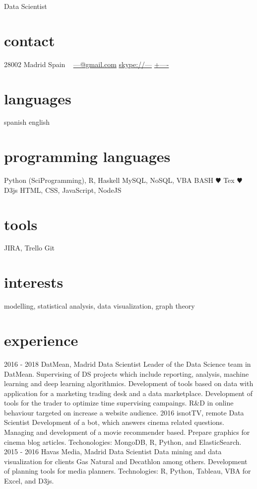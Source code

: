 \documentclass[]{friggeri-cv}
\begin{document}
\ifenglish
{}
       {Data Scientist}


\begin{aside}
  \section{contact}
    28002 Madrid
    Spain
    ~
    \href{mailto:---@gmail.com}{---@gmail.com}
    \href{skype:<--->[add]}{skype://---}
    \href{tel:----}{+----}
  \section{languages}
    spanish
    english
  \section{programming languages}
    Python (SciProgramming), R, Haskell
    MySQL, NoSQL, VBA
    BASH
    {\color{red} $\varheartsuit$} Tex
    {\color{red} $\varheartsuit$} D3js
    HTML, CSS, JavaScript, NodeJS
  \section{tools}
    JIRA, Trello
    Git
\end{aside}

\section{interests}

modelling, statistical analysis, data visualization, graph theory

\section{experience}

\begin{entrylist}
  \entry
    {2016 - 2018}
    {DatMean, Madrid}
    {Data Scientist}
    {Leader of the Data Science team in DatMean. Supervising of DS projects which include reporting, analysis, machine learning and deep learning algorithmics. Development of tools based on data with application for a marketing trading desk and a data marketplace. Development of tools for the trader to optimize time supervising campaings. R\&D in online behaviour targeted on increase a website audience.}
  \entry
    {2016}
    {isnotTV, remote}
    {Data Scientist}
    {Development of a bot, which answers cinema related questions. Managing and development of a movie recommender based. Prepare graphics for cinema blog articles. Techonologies: MongoDB, R, Python, and ElasticSearch.}
  \entry
    {2015 - 2016}
    {Havas Media, Madrid}
    {Data Scientist}
    {Data mining and data visualization for clients Gas Natural and Decathlon among others. Development of planning tools for media planners. Technologies: R, Python, Tableau, VBA for Excel, and D3js.}
\end{entrylist}
\end{document}
